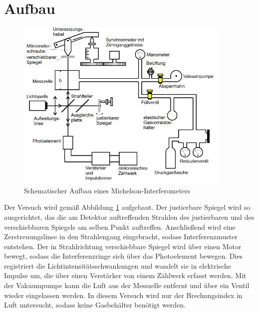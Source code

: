 \section{Aufbau}
\label{sec:Aufbau}

\begin{figure}
\centering
\includegraphics[scale=0.5]{content/images/aufbau.jpg}
\caption{Schematischer Aufbau eines Michelson-Interferometers\cite{V401}}
\label{fig:Aufbau}
\end{figure}

\noindent Der Versuch wird gemäß Abbildung \ref{fig:Aufbau} aufgebaut. Der justierbare Spiegel wird so ausgerichtet, das die am Detektor auftreffenden Strahlen des justierbaren und des verschiebbaren Spiegels
am selben Punkt auftreffen. Anschließend wird eine Zerstreuungslinse in den Strahlengang eingebracht, sodass Interferenzmuster entstehen. Der in Strahlrichtung verschiebbare Spiegel wird über einen Motor bewegt, sodass die Interferenzringe sich über das Photoelement bewegen. Dies registriert die Lichtintensitätsschwankungen und wandelt sie in elektrische Impulse um, die über einen Verstärker von einem Zählwerk erfasst werden.
Mit der Vakuumpumpe kann die Luft aus der Messzelle entfernt und über ein Ventil wieder eingelassen werden. In diesem Versuch wird nur der Brechungsindex in Luft untersucht, sodass keine Gasbehälter benötigt werden.